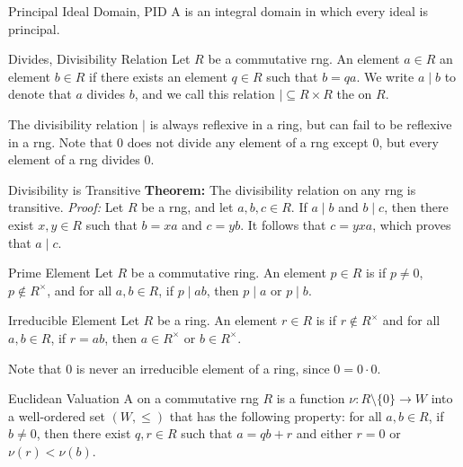 \begin{dfnbox}{Principal Ideal Domain, PID}
	A  is an integral domain in which every ideal is principal.
\end{dfnbox}

\begin{dfnbox}{Divides, Divisibility Relation}
	Let $R$ be a commutative rng. An element $a \in R$  an element $b \in R$ if there exists an element $q \in R$ such that $b = qa$. We write $a \mid b$ to denote that $a$ divides $b$, and we call this relation ${\mid} \subseteq R \times R$ the  on $R$.
\end{dfnbox}

The divisibility relation $\mid$ is always reflexive in a ring, but can fail to be reflexive in a rng. Note that $0$ does not divide any element of a rng except $0$, but every element of a rng divides $0$.

\begin{thmbox}{Divisibility is Transitive}
	\textbf{Theorem:} The divisibility relation on any rng is transitive.
\tcblower
	\textit{Proof:} Let $R$ be a rng, and let $a, b, c \in R$. If $a \mid b$ and $b \mid c$, then there exist $x, y \in R$ such that $b = xa$ and $c = yb$. It follows that $c = yxa$, which proves that $a \mid c$.
\end{thmbox}

\begin{dfnbox}{Prime Element}
	Let $R$ be a commutative ring. An element $p \in R$ is  if $p \ne 0$, $p \notin R^\times$, and for all $a, b \in R$, if $p \mid ab$, then $p \mid a$ or $p \mid b$.
\end{dfnbox}

\begin{dfnbox}{Irreducible Element}
	Let $R$ be a ring. An element $r \in R$ is  if $r \notin R^\times$ and for all $a, b \in R$, if $r = ab$, then $a \in R^\times$ or $b \in R^\times$.
\end{dfnbox}

Note that $0$ is never an irreducible element of a ring, since $0 = 0 \cdot 0$.

\begin{dfnbox}{Euclidean Valuation}
	A  on a commutative rng $R$ is a function $\nu: R \setminus \{0\} \to W$ into a well-ordered set $(W, \le)$ that has the following property: for all $a, b \in R$, if $b \ne 0$, then there exist $q, r \in R$ such that $a = qb + r$ and either $r = 0$ or $\nu(r) < \nu(b)$.
\end{dfnbox}

